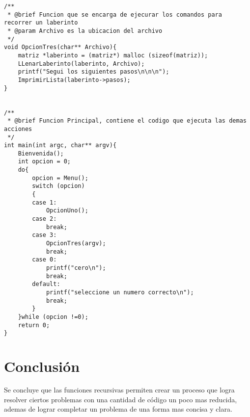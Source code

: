 \begin{verbatim}
/**
 * @brief Funcion que se encarga de ejecurar los comandos para recorrer un laberinto
 * @param Archivo es la ubicacion del archivo
 */
void OpcionTres(char** Archivo){
    matriz *laberinto = (matriz*) malloc (sizeof(matriz));
    LLenarLaberinto(laberinto, Archivo);
    printf("Segui los siguientes pasos\n\n\n");
    ImprimirLista(laberinto->pasos);
}


/**
 * @brief Funcion Principal, contiene el codigo que ejecuta las demas acciones
 */
int main(int argc, char** argv){
    Bienvenida();
    int opcion = 0;
    do{
        opcion = Menu();
        switch (opcion)
        {
        case 1:
            OpcionUno();
        case 2:
            break;
        case 3:
            OpcionTres(argv);
            break;
        case 0:
            printf("cero\n");
            break;
        default:
            printf("seleccione un numero correcto\n");
            break;
        }
    }while (opcion !=0);
    return 0;
}
\end{verbatim}
\newpage
\section{Conclusión}
Se concluye que las funciones recursivas permiten crear un proceso que logra resolver ciertos problemas con una cantidad de código un poco mas reducida, ademas de lograr completar un problema de una forma mas concisa y clara. 


